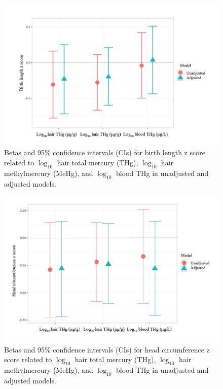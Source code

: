 \begin{figure}
  \centering
    \label{fig:Fig320}
  \includegraphics[scale=1]{Figures/Fig320.pdf}
  \caption[Betas and 95\% confidence intervals for birth length z score related to $\log_{10}$ hair total mercury, $\log_{10}$ hair methylmercury, and $\log_{10}$ blood  total mercury in unadjusted and adjusted models]{Betas and 95\% confidence intervals (CIs) for birth length z score related to $\log_{10}$ hair total mercury (THg), $\log_{10}$ hair methylmercury (MeHg), and $\log_{10}$ blood THg in unadjusted and adjusted models.}
\end{figure}


\begin{figure}
  \centering
    \label{fig:Fig321}
  \includegraphics[scale=1]{Figures/Fig321.pdf}
  \caption[Betas and 95\% confidence intervals for head circumference z score related to $\log_{10}$ hair total mercury, $\log_{10}$ hair methylmercury, and $\log_{10}$ blood total mercury in unadjusted and adjusted models]{Betas and 95\% confidence intervals (CIs) for head circumference z score related to $\log_{10}$ hair total mercury (THg), $\log_{10}$ hair methylmercury (MeHg), and $\log_{10}$ blood THg in unadjusted and adjusted models.}
\end{figure}


